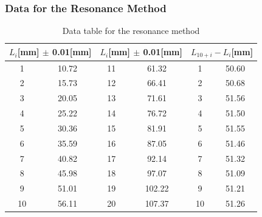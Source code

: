 \documentclass[12pt]{article}
\begin{document}
\subsubsection{Data for the Resonance Method}
\begin{table}[H]
\centering
\begin{tabular}{|c|c|c|c|c|c|}
\hline
\multicolumn{2}{|c|}{$L_i$[mm] $\pm$ 0.01[mm]} & \multicolumn{2}{c|}{$L_i$[mm] $\pm$ 0.01[mm]} & \multicolumn{2}{c|}{$L_{10+i}-L_i$[mm]} \\ \hline
1           &10.72          & 11         &61.32          & 1          &50.60          \\ \hline
2           &15.73          & 12         &66.41          & 2          &50.68          \\ \hline
3           &20.05          & 13         &71.61          & 3          &51.56          \\ \hline
4           &25.22          & 14         &76.72          & 4          &51.50          \\ \hline
5           &30.36          & 15         &81.91          & 5          &51.55          \\ \hline
6           &35.59          & 16         &87.05          & 6          &51.46          \\ \hline
7           &40.82          & 17         &92.14          & 7          &51.32          \\ \hline
8           &45.98          & 18         &97.07          & 8          &51.09          \\ \hline
9           &51.01          & 19         &102.22          & 9          &51.21        \\ \hline
10          &56.11          & 20         &107.37          & 10         &51.26          \\ \hline
\end{tabular}
\caption{Data table for the resonance method}
\end{table}
\end{document}
